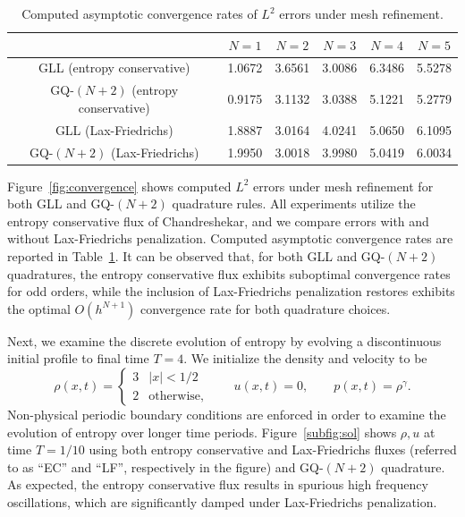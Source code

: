 \documentclass[preprint,10pt]{article}
\theoremstyle{definition}
\theoremstyle{lemma}
\theoremstyle{theorem}
\theoremstyle{assumption}
\newcommand{\LRb}[1]{\left| #1 \right|}
\begin{document}
\begin{table}[h!]
\centering
 \begin{tabular}{||c | c |c |c |c | c|} 
 \hline
 &  $N=1$ &  $N=2$ &  $N=3$ &  $N=4$ &  $N=5$\\
 \hline
 GLL (entropy conservative) & 1.0672 & 3.6561  &  3.0086 &   6.3486 &   5.5278\\ 
 \hline
 GQ-$(N+2)$ (entropy conservative) &  0.9175  &  3.1132  &  3.0388 &   5.1221 &   5.2779 \\ 
 \hline
 GLL (Lax-Friedrichs) & 1.8887  &  3.0164  &  4.0241 &   5.0650 &   6.1095\\ 
 \hline
 GQ-$(N+2)$ (Lax-Friedrichs) & 1.9950  &  3.0018  &  3.9980  &  5.0419  &  6.0034\\ 
 \hline
 \end{tabular}
 \caption{Computed asymptotic convergence rates of $L^2$ errors under mesh refinement.}
 \label{tab:rates}
\end{table}

Figure~\ref{fig:convergence} shows computed $L^2$ errors under mesh refinement for both GLL and GQ-$(N+2)$ quadrature rules.  All experiments utilize the entropy conservative flux of Chandreshekar, and we compare errors with and without Lax-Friedrichs penalization.  Computed asymptotic convergence rates are reported in Table~\ref{tab:rates}.  It can be observed that, for both GLL and GQ-$(N+2)$ quadratures, the entropy conservative flux exhibits suboptimal convergence rates for odd orders, while the inclusion of Lax-Friedrichs penalization restores exhibits the optimal $O(h^{N+1})$ convergence rate for both quadrature choices.

Next, we examine the discrete evolution of entropy by evolving a discontinuous initial profile to final time $T=4$.  We initialize the density and velocity to be 
\begin{equation}
\rho(x,t) = \begin{cases}
3 & \LRb{x} < 1/2\\
2 & \text{otherwise},
\end{cases} \qquad 
u(x,t) = 0, \qquad
p(x,t) = \rho^\gamma.
\label{eq:discontin}
\end{equation}
Non-physical periodic boundary conditions are enforced in order to examine the evolution of entropy over longer time periods.  Figure~\ref{subfig:sol} shows $\rho, u$ at time $T = 1/10$ using both entropy conservative and Lax-Friedrichs fluxes (referred to as ``EC'' and ``LF'', respectively in the figure) and GQ-$(N+2)$ quadrature.  As expected, the entropy conservative flux results in spurious high frequency oscillations, which are significantly damped under Lax-Friedrichs penalization.  
\end{document}
